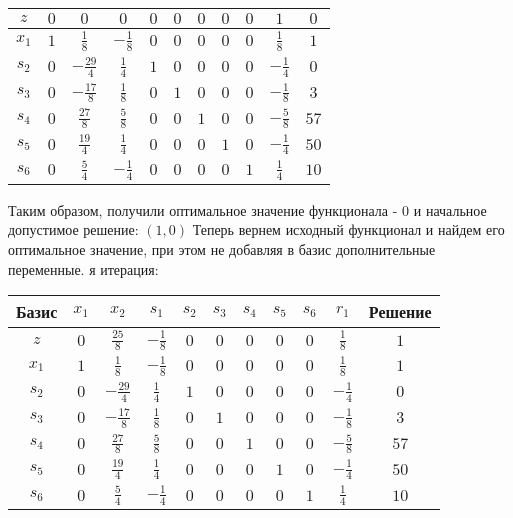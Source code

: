 \documentclass{article}%
\begin{document}
\begin{flushleft}
\begin{tabular}{|c|ccccccccc|c|}
\hline%
$z$&$0$&$0$&$0$&$0$&$0$&$0$&$0$&$0$&$1$&$0$\\%
\hline%
$x_{1}$&$1$&$\frac{1}{8}$&$-\frac{1}{8}$&$0$&$0$&$0$&$0$&$0$&$\frac{1}{8}$&$1$\\%
$s_{2}$&$0$&$-\frac{29}{4}$&$\frac{1}{4}$&$1$&$0$&$0$&$0$&$0$&$-\frac{1}{4}$&$0$\\%
$s_{3}$&$0$&$-\frac{17}{8}$&$\frac{1}{8}$&$0$&$1$&$0$&$0$&$0$&$-\frac{1}{8}$&$3$\\%
$s_{4}$&$0$&$\frac{27}{8}$&$\frac{5}{8}$&$0$&$0$&$1$&$0$&$0$&$-\frac{5}{8}$&$57$\\%
$s_{5}$&$0$&$\frac{19}{4}$&$\frac{1}{4}$&$0$&$0$&$0$&$1$&$0$&$-\frac{1}{4}$&$50$\\%
$s_{6}$&$0$&$\frac{5}{4}$&$-\frac{1}{4}$&$0$&$0$&$0$&$0$&$1$&$\frac{1}{4}$&$10$\\%
\hline%
\end{tabular}%
\newline%
\newline%
Таким образом, получили оптимальное значение функционала {-} 0 и начальное допустимое решение: %
$(1, 0)$%
\newline%
Теперь вернем исходный функционал и найдем его оптимальное значение, при этом не добавляя в базис дополнительные переменные.%
я итерация: %
\newline%
\newline%
\renewcommand{\arraystretch}{1.3}%
\begin{tabular}{|c|ccccccccc|c|}%
\hline%
Базис&$x_{1}$&$x_{2}$&$s_{1}$&$s_{2}$&$s_{3}$&$s_{4}$&$s_{5}$&$s_{6}$&$r_{1}$&Решение\\%
\hline%
$z$&$0$&$\frac{25}{8}$&$-\frac{1}{8}$&$0$&$0$&$0$&$0$&$0$&$\frac{1}{8}$&$1$\\%
\hline%
$x_{1}$&$1$&$\frac{1}{8}$&$-\frac{1}{8}$&$0$&$0$&$0$&$0$&$0$&$\frac{1}{8}$&$1$\\%
$s_{2}$&$0$&$-\frac{29}{4}$&$\frac{1}{4}$&$1$&$0$&$0$&$0$&$0$&$-\frac{1}{4}$&$0$\\%
$s_{3}$&$0$&$-\frac{17}{8}$&$\frac{1}{8}$&$0$&$1$&$0$&$0$&$0$&$-\frac{1}{8}$&$3$\\%
$s_{4}$&$0$&$\frac{27}{8}$&$\frac{5}{8}$&$0$&$0$&$1$&$0$&$0$&$-\frac{5}{8}$&$57$\\%
$s_{5}$&$0$&$\frac{19}{4}$&$\frac{1}{4}$&$0$&$0$&$0$&$1$&$0$&$-\frac{1}{4}$&$50$\\%
$s_{6}$&$0$&$\frac{5}{4}$&$-\frac{1}{4}$&$0$&$0$&$0$&$0$&$1$&$\frac{1}{4}$&$10$\\%
\hline%
\end{tabular}%

\end{flushleft}
\end{document}

